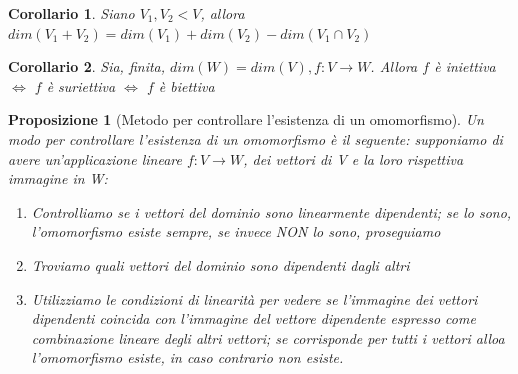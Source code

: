 \documentclass[12pt]{article}
\newenvironment{para}{\begin{adjustwidth}{13mm}{}}{\end{adjustwidth}}
\newtheorem{Corollario}{Corollario}[subsection]
\newtheorem{Proposizione}{Proposizione}[subsection]
\begin{document}
\begin{para}
\begin{Corollario}
    Siano $V_1, V_2 < V$, allora $dim(V_1+V_2)=dim(V_1)+dim(V_2)-dim(V_1 \cap V_2)$
\end{Corollario}
\begin{Corollario}
    Sia, finita, $dim(W)=dim(V), f:V \rightarrow W$. Allora $f$ è iniettiva $\Leftrightarrow$ $f$ è suriettiva $\Leftrightarrow$ $f$ è biettiva
\end{Corollario}
\begin{Proposizione}[Metodo per controllare l'esistenza di un omomorfismo] Un modo per controllare l'esistenza di un omomorfismo è il seguente: supponiamo di avere un'applicazione lineare $f:V\rightarrow W$, dei vettori di V e la loro rispettiva immagine in W:
\begin{enumerate}
    \item Controlliamo se i vettori del dominio sono linearmente dipendenti; se lo sono, l'omomorfismo esiste sempre, se invece NON lo sono, proseguiamo
    \item Troviamo quali vettori del dominio sono dipendenti dagli altri
    \item Utilizziamo le condizioni di linearità per vedere se l'immagine dei vettori dipendenti coincida con l'immagine del vettore dipendente espresso come combinazione lineare degli altri vettori; se corrisponde per tutti i vettori alloa l'omomorfismo esiste, in caso contrario non esiste.
\end{enumerate}
    
\end{Proposizione}

\end{para}
\end{document}
